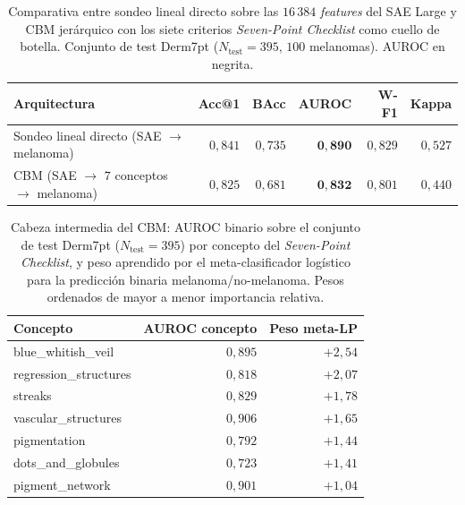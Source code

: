 \begin{table}[H]
\centering
\footnotesize
\setlength{\tabcolsep}{4pt}
\renewcommand{\arraystretch}{0.95}
\caption{Comparativa entre sondeo lineal directo sobre las
$16\,384$ \emph{features} del SAE Large y CBM jerárquico con
los siete criterios \emph{Seven-Point Checklist} como cuello de
botella. Conjunto de test Derm7pt
($N_{\mathrm{test}} = 395$, $100$ melanomas). AUROC en
negrita.}
\label{tab:sae-d7pt-cbm}
\begin{tabular}{lrrrrr}
\hline
Arquitectura                                & Acc@1     & BAcc      & AUROC              & W-F1      & Kappa     \\
\hline
Sondeo lineal directo (SAE $\to$ melanoma)  & $0{,}841$ & $0{,}735$ & $\mathbf{0{,}890}$ & $0{,}829$ & $0{,}527$ \\
CBM (SAE $\to$ $7$ conceptos $\to$ melanoma) & $0{,}825$ & $0{,}681$ & $\mathbf{0{,}832}$ & $0{,}801$ & $0{,}440$ \\
\hline
\end{tabular}
\end{table}

\begin{table}[H]
\centering
\footnotesize
\setlength{\tabcolsep}{4pt}
\renewcommand{\arraystretch}{0.95}
\caption{Cabeza intermedia del CBM: AUROC binario sobre el conjunto
de test Derm7pt ($N_{\mathrm{test}} = 395$) por concepto del
\emph{Seven-Point Checklist}, y peso aprendido por el
meta-clasificador logístico para la predicción binaria
melanoma/no-melanoma. Pesos ordenados de mayor a menor
importancia relativa.}
\label{tab:sae-d7pt-cbm-coefs}
\begin{tabular}{lrr}
\hline
Concepto                & AUROC concepto & Peso meta-LP \\
\hline
blue\_whitish\_veil     & $0{,}895$ & $+2{,}54$ \\
regression\_structures  & $0{,}818$ & $+2{,}07$ \\
streaks                 & $0{,}829$ & $+1{,}78$ \\
vascular\_structures    & $0{,}906$ & $+1{,}65$ \\
pigmentation            & $0{,}792$ & $+1{,}44$ \\
dots\_and\_globules     & $0{,}723$ & $+1{,}41$ \\
pigment\_network        & $0{,}901$ & $+1{,}04$ \\
\hline
\end{tabular}
\end{table}

